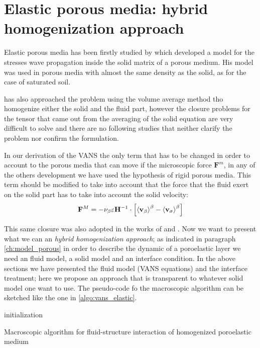 \section{Elastic porous media: hybrid homogenization approach}

Elastic porous media has been firstly studied by \citet{biot1956theory} which developed a model for the stresses wave propagation inside the solid matrix of a porous medium.
His model was used in porous media with almost the same density as the solid, as for the case of saturated soil.

\citet{whitaker1986deformable} has also approached the problem using the volume average method tho homogenize either the solid and the fluid part, however the closure problems for the tensor that came out from the averaging of the solid equation are very difficult to solve and there are no following studies that neither clarify the problem nor confirm the formulation.

In our derivation of the VANS the only term that has to be changed in order to account to the porous media that can move if the microscopic force $\mathbf{F}^m$, in any of the others development we have used the hypothesis of rigid porous media.
This term should be modified to take into account that the force that the fluid exert on the solid part has to take into account the solid velocity:
$$
\mathbf{F}^M = - \nu_{\beta} \varepsilon \mathbf{H}^{-1} \cdot \left[ {\left< \textbf{v}_{\beta} \right>}^{\beta} - {\left< \textbf{v}_{\sigma} \right>}^{\beta} \right]
$$

This same closure was also adopted in the works of \citet{hussong2011continuum} and \citet{wang2015volume}.
Now we want to present what we can an \textit{hybrid homogenization approach}; as indicated in paragraph \ref{ch:model_porous} in order to describe the dynamic of a poroelastic layer we need an fluid model, a solid model and an interface condition.
In the above sections we have presented the fluid model (VANS equations) and the interface treatment; here we propose an approach that is transparent to whatever solid model one want to use.
The pseudo-code fo the macroscopic algorithm can be sketched like the one in \ref{algo:vans_elastic}.

\begin{algorithm}[H]
	initialization\;
	\caption{Macroscopic algorithm for fluid-structure interaction of homogenized poroelastic medium}
	\label{algo:vans_elastic}
\end{algorithm}

